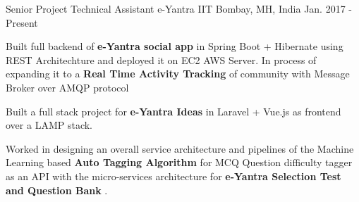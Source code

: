 

\begin{cventries}

  \cventry
    {Senior Project Technical Assistant} %
    {e-Yantra} %
    {IIT Bombay, MH, India} %
    {Jan. 2017 - Present} %
    {
      \begin{cvitems} %
        \item {Built full backend of \textbf{e-Yantra social app} in Spring Boot + Hibernate using REST Architechture  and deployed it on EC2 AWS Server. In process of expanding it to a \textbf{Real Time Activity Tracking}  of community with Message Broker over AMQP protocol}
        \item {Built a full stack project for \textbf{e-Yantra Ideas} in Laravel + Vue.js as frontend over a LAMP stack.}
        \item {Worked in designing an overall service architecture and pipelines of the Machine Learning based \textbf{Auto Tagging Algorithm} for MCQ Question difficulty tagger as an API with the micro-services architecture for \textbf{e-Yantra Selection Test and Question Bank} .}
      \end{cvitems}
    }
\end{cventries}
